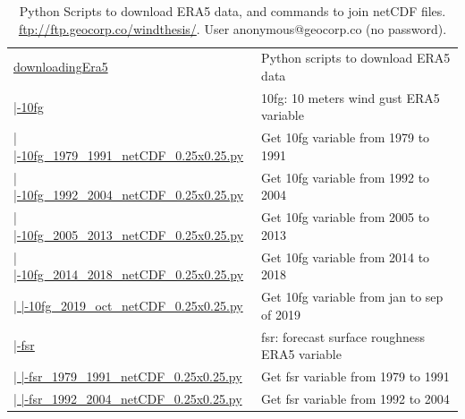 \documentclass[12pt,oneside]{reedthesis}
\begin{document}
\begingroup\fontsize{8}{10}\selectfont
\begin{longtable}[t]{>{\raggedright\arraybackslash}p{2.3in}>{\raggedright\arraybackslash}p{3in}}
\caption[Python Scripts to download ERA5 data]{\label{tab:pythonera5}Python Scripts to download ERA5 data, and commands to join netCDF files.  \href{ftp://ftp.geocorp.co/windthesis/}{ftp://ftp.geocorp.co/windthesis/}. User anonymous@geocorp.co (no password).}\\
\toprule
\multicolumn{1}{l}{Folder Tree - Ftp Links} & \multicolumn{1}{l}{Description}\\
\midrule
\href{ftp://ftp.geocorp.co/windthesis/downloadingEra5/}{downloadingEra5} & Python scripts to download ERA5 data\\
\href{ftp://ftp.geocorp.co/windthesis/downloadingEra5/10fg/}{  |-10fg} & 10fg: 10 meters wind gust ERA5 variable\\
\href{ftp://ftp.geocorp.co/windthesis/downloadingEra5/10fg/10fg_1979_1991_netCDF_0.25x0.25.py}{  |    |-10fg\_1979\_1991\_netCDF\_0.25x0.25.py} & Get 10fg variable from 1979 to 1991\\
\href{ftp://ftp.geocorp.co/windthesis/downloadingEra5/10fg/10fg_1992_2004_netCDF_0.25x0.25.py}{  |    |-10fg\_1992\_2004\_netCDF\_0.25x0.25.py} & Get 10fg variable from 1992 to 2004\\
\href{ftp://ftp.geocorp.co/windthesis/downloadingEra5/10fg/10fg_2005_2013_netCDF_0.25x0.25.py}{  |    |-10fg\_2005\_2013\_netCDF\_0.25x0.25.py} & Get 10fg variable from 2005 to 2013\\
\href{ftp://ftp.geocorp.co/windthesis/downloadingEra5/10fg/10fg_2014_2018_netCDF_0.25x0.25.py}{  |    |-10fg\_2014\_2018\_netCDF\_0.25x0.25.py} & Get 10fg variable from 2014 to 2018\\
\href{ftp://ftp.geocorp.co/windthesis/downloadingEra5/10fg/10fg_2019_oct_netCDF_0.25x0.25.py}{  |    |-10fg\_2019\_oct\_netCDF\_0.25x0.25.py} & Get 10fg variable from jan to sep of 2019\\
\href{ftp://ftp.geocorp.co/windthesis/downloadingEra5/fsr/}{  |-fsr} & fsr: forecast surface roughness ERA5 variable\\
\href{ftp://ftp.geocorp.co/windthesis/downloadingEra5/fsr/fsr_1979_1991_netCDF_0.25x0.25.py}{  |    |-fsr\_1979\_1991\_netCDF\_0.25x0.25.py} & Get fsr variable from 1979 to 1991\\
\href{ftp://ftp.geocorp.co/windthesis/downloadingEra5/fsr/fsr_1992_2004_netCDF_0.25x0.25.py}{  |    |-fsr\_1992\_2004\_netCDF\_0.25x0.25.py} & Get fsr variable from 1992 to 2004\\

\end{longtable}
\end{document}
